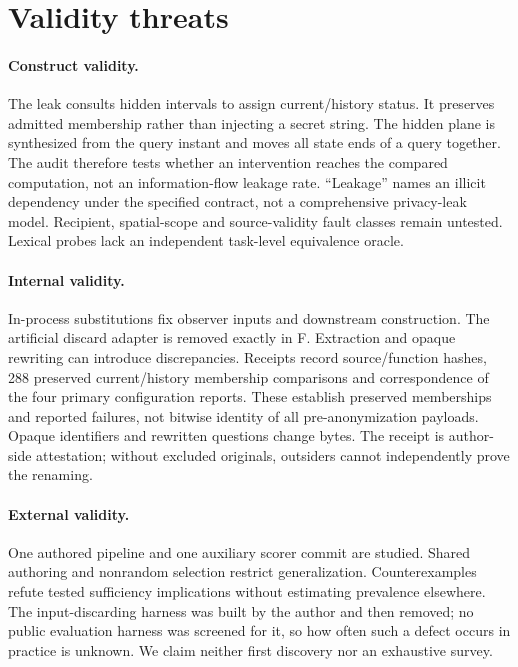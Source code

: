 \documentclass[11pt]{article}
\begin{document}
\section{Validity threats}
\paragraph{Construct validity.}
The leak consults hidden intervals to assign current/history status. It preserves admitted membership rather than injecting a secret string. The hidden plane is synthesized from the query instant and moves all state ends of a query together. The audit therefore tests whether an intervention reaches the compared computation, not an information-flow leakage rate. ``Leakage'' names an illicit dependency under the specified contract, not a comprehensive privacy-leak model. Recipient, spatial-scope and source-validity fault classes remain untested. Lexical probes lack an independent task-level equivalence oracle.

\paragraph{Internal validity.}
In-process substitutions fix observer inputs and downstream construction. The artificial discard adapter is removed exactly in F. Extraction and opaque rewriting can introduce discrepancies. Receipts record source/function hashes, 288 preserved current/history membership comparisons and correspondence of the four primary configuration reports. These establish preserved memberships and reported failures, not bitwise identity of all pre-anonymization payloads. Opaque identifiers and rewritten questions change bytes. The receipt is author-side attestation; without excluded originals, outsiders cannot independently prove the renaming.

\paragraph{External validity.}
One authored pipeline and one auxiliary scorer commit are studied. Shared authoring and nonrandom selection restrict generalization. Counterexamples refute tested sufficiency implications without estimating prevalence elsewhere. The input-discarding harness was built by the author and then removed; no public evaluation harness was screened for it, so how often such a defect occurs in practice is unknown. We claim neither first discovery nor an exhaustive survey.
\end{document}
